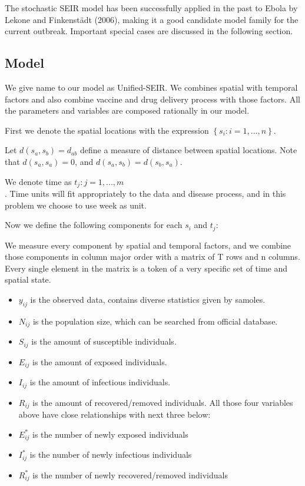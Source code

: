 \documentclass[11pt]{article}
\begin{document}
The stochastic SEIR model has been successfully applied in the past to Ebola by Lekone and Finkenst{\"a}dt (2006), making it a good candidate model family for the current outbreak. 
Important special cases are discussed in the following section.



\subsection{Model}

We give name to our model as Unified-SEIR. We combines spatial with temporal factors and also combine vaccine and drug delivery process with those factors. All the parameters and variables are composed rationally in our model. 

First we denote the spatial locations with the expression $\left\{s_i : i = 1, ...,n \right\}$.

Let $d(s_a, s_b) = d_{ab}$ define a measure of distance between spatial locations. Note that $d(s_a, s_a) = 0$, and $d(s_a, s_b) = d(s_b, s_a)$.
        
        We denote time as ${t_j : j = 1, ...,m}$ \\. Time units will fit appropriately to the data and disease process, and in this problem we choose to use week as unit.


 Now we define the following components for each $s_i$ and $t_j$:

We measure every component by spatial and temporal factors, and we combine those components in column major order with a matrix of T rows and n columns. Every single element in the matrix is a token of a very specific set of time and spatial state. 

\begin{itemize}
            \item {$y_{ij}$} is the observed data, contains diverse statistics given by samoles.
            \item {${N_{ij}}$} is the population size, which can be searched from official database.
            \item {${S_{ij}}$} is the amount of susceptible individuals.
            \item {${E_{ij}}$} is the amount of exposed individuals.
            \item {${I_{ij}}$} is the amount of infectious individuals.
            \item {${R_{ij}}$} is the amount of recovered/removed individuals. All those four variables above have close relationships with next three below: 
            
            \item {${E^*_{ij}}$} is the number of newly exposed individuals
            \item {${I^*_{ij}}$} is the number of newly infectious individuals
            \item {${R^*_{ij}}$} is the number of newly recovered/removed individuals
        \end{itemize}
        
\end{document}
